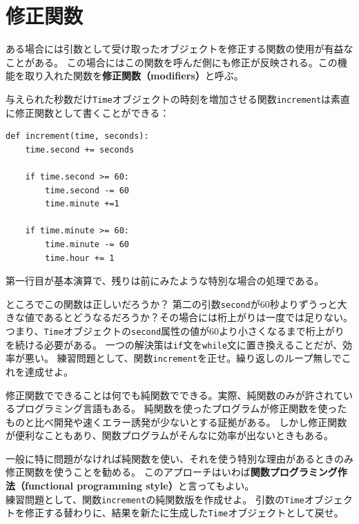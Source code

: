 \documentclass[a4j,12pt,makeidx]{jbook}
\begin{document}
\section{修正関数}
ある場合には引数として受け取ったオブジェクトを修正する関数の使用が有益なことがある。
この場合にはこの関数を呼んだ側にも修正が反映される。この機能を取り入れた関数を{\bf 修正関数（modifiers）}と呼ぶ。\par
与えられた秒数だけ{\tt Time}オブジェクトの時刻を増加させる関数{\tt increment}は素直に修正関数として書くことができる：
\begin{verbatim}
def increment(time, seconds):
    time.second += seconds

    if time.second >= 60:
        time.second -= 60
        time.minute +=1

    if time.minute >= 60:
        time.minute -= 60
        time.hour += 1
\end{verbatim}
第一行目が基本演算で、残りは前にみたような特別な場合の処理である。\par
ところでこの関数は正しいだろうか？
第二の引数{\tt second}が60秒よりずうっと大きな値であるとどうなるだろうか？その場合には桁上がりは一度では足りない。
つまり、{\tt Time}オブジェクトの{\tt second}属性の値が60より小さくなるまで桁上がりを続ける必要がある。
一つの解決策は{\tt if}文を{\tt while}文に置き換えることだが、効率が悪い。
練習問題として、関数{\tt increment}を正せ。繰り返しのループ無しでこれを達成せよ。\par
修正関数でできることは何でも純関数でできる。実際、純関数のみが許されているプログラミング言語もある。
純関数を使ったプログラムが修正関数を使ったものと比べ開発や速くエラー誘発が少ないとする証拠がある。
しかし修正関数が便利なこともあり、関数プログラムがそんなに効率が出ないときもある。\par
一般に特に問題がなければ純関数を使い、それを使う特別な理由があるときのみ修正関数を使うことを勧める。
このアプローチはいわば{\bf 関数プログラミング作法（functional programming style）}と言ってもよい。 \\
練習問題として、関数{\tt increment}の純関数版を作成せよ。
引数の{\tt Time}オブジェクトを修正する替わりに、結果を新たに生成した{\tt Time}オブジェクトとして戻せ。
%
\end{document}
